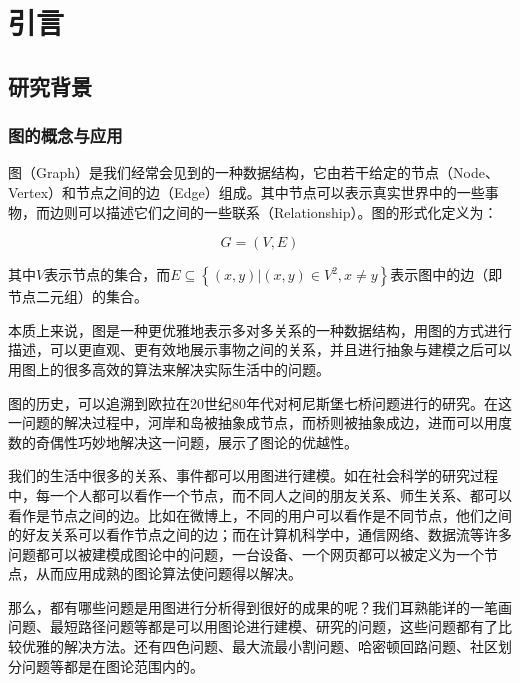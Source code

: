
\chapter{引言}
\label{cha:intro}

\section{研究背景}

\subsection{图的概念与应用}

图（Graph）是我们经常会见到的一种数据结构，它由若干给定的节点（Node、Vertex）和节点之间的边（Edge）组成。其中节点可以表示真实世界中的一些事物，而边则可以描述它们之间的一些联系（Relationship）。图的形式化定义为：

\vspace{-8mm}

\begin{equation}
G=(V,E)
\end{equation}

\noindent 其中$V$表示节点的集合，而$E \subseteq\left\{(x, y)|(x, y) \in V^{2}, x \neq y\right\}$表示图中的边（即节点二元组）的集合。

本质上来说，图是一种更优雅地表示多对多关系的一种数据结构，用图的方式进行描述，可以更直观、更有效地展示事物之间的关系，并且进行抽象与建模之后可以用图上的很多高效的算法来解决实际生活中的问题。

图的历史，可以追溯到欧拉在20世纪80年代对柯尼斯堡七桥问题\cite{biggs1986graph}进行的研究。在这一问题的解决过程中，河岸和岛被抽象成节点，而桥则被抽象成边，进而可以用度数的奇偶性巧妙地解决这一问题，展示了图论的优越性。

我们的生活中很多的关系、事件都可以用图进行建模。如在社会科学的研究过程中，每一个人都可以看作一个节点，而不同人之间的朋友关系、师生关系、都可以看作是节点之间的边。比如在微博上，不同的用户可以看作是不同节点，他们之间的好友关系可以看作节点之间的边；而在计算机科学中，通信网络、数据流等许多问题都可以被建模成图论中的问题，一台设备、一个网页都可以被定义为一个节点，从而应用成熟的图论算法使问题得以解决。

那么，都有哪些问题是用图进行分析得到很好的成果的呢？我们耳熟能详的一笔画问题、最短路径问题等都是可以用图论进行建模、研究的问题，这些问题都有了比较优雅的解决方法。还有四色问题、最大流最小割问题、哈密顿回路问题、社区划分问题等都是在图论范围内的。

